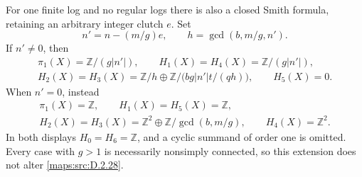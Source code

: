 \begin{theorem}
For one finite log and no regular logs there is also a closed
Smith formula, retaining an arbitrary integer clutch $e$.
Set
\[
 n'=n-(m/g)e,
 \qquad h=\gcd(b,m/g,n').                                  \tag{D.AF5}\label{maps:eq:D.AF5}
\]
If $n'\ne0$, then
\[
\begin{gathered}
 \pi_1(X)=\mathbb Z/(g|n'|),\qquad
 H_1(X)=H_4(X)=\mathbb Z/(g|n'|),\\
 H_2(X)=H_3(X)=
 \mathbb Z/h\oplus\mathbb Z/\bigl(bg|n'|t/(qh)\bigr),
 \qquad H_5(X)=0.
\end{gathered}                                               \tag{D.AF6}\label{maps:eq:D.AF6}
\]
When $n'=0$, instead
\[
\begin{gathered}
 \pi_1(X)=\mathbb Z,\qquad H_1(X)=H_5(X)=\mathbb Z,\\
 H_2(X)=H_3(X)=\mathbb Z^2\oplus
                         \mathbb Z/\gcd(b,m/g),\qquad
 H_4(X)=\mathbb Z^2.
\end{gathered}                                               \tag{D.AF7}\label{maps:eq:D.AF7}
\]
In both displays $H_0=H_6=\mathbb Z$, and a cyclic summand of
order one is omitted. Every case with $g>1$ is necessarily
nonsimply connected, so this extension does not alter \ref{maps:src:D.2.28}.

\end{theorem}


